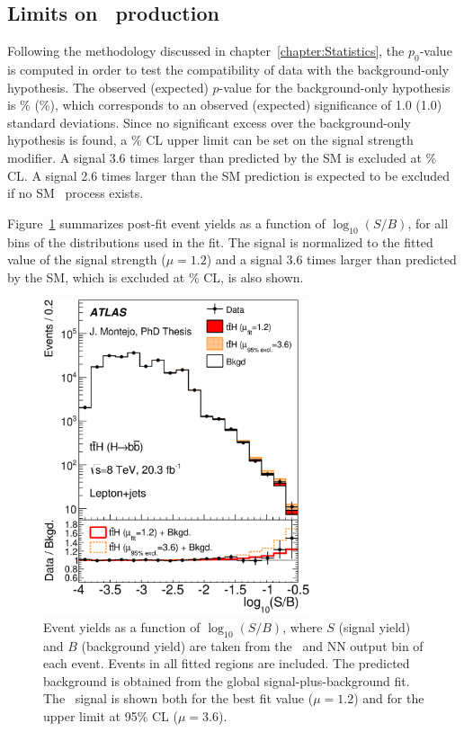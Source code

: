 \subsection{Limits on \ttH\ production}
Following the methodology discussed in chapter~\ref{chapter:Statistics}, the $p_0$-value is computed in order to test the compatibility of data with the background-only hypothesis. 
The observed (expected) $p$-value for the background-only hypothesis is \unit[15]{\%} (\unit[16]{\%}), which corresponds to an observed (expected)  significance of 1.0 (1.0) standard deviations. Since no significant excess over the background-only hypothesis is found, a \unit[95]{\%} CL upper limit can be set on the signal strength modifier. A signal 3.6 times larger than predicted by the SM is excluded at \unit[95]{\%} CL. A signal 2.6 times larger than the SM prediction is expected to be excluded if no SM \ttH\ process exists.

Figure~\ref{fig:SBordered_lj} summarizes post-fit event yields as a function of $\log_{10}(S/B)$, for all bins of the distributions used in the fit. The signal is normalized to the fitted value of the signal strength ($\mu = 1.2$) and a signal 3.6 times larger than predicted by the SM, which is excluded at \unit[95]{\%} CL, is also shown.

\begin{figure}[tbp!]
  \centering
  \includegraphics[width=0.7\textwidth]{Analysis/Figures_ttH/SBplot_lj_postfit.eps}
\caption{Event yields as a function of $\log_{10}(S/B)$, where $S$ 
(signal yield) and $B$ (background yield) are taken from the \hthad\ and NN output bin of each event.  Events in all fitted regions are included. 
The predicted background is obtained from the global signal-plus-background fit.  
The \tth\ signal is shown both for the best fit value ($\mu = 1.2$) and for the upper limit at 95\% CL ($\mu=3.6$).}
  \label{fig:SBordered_lj}
\end{figure}

